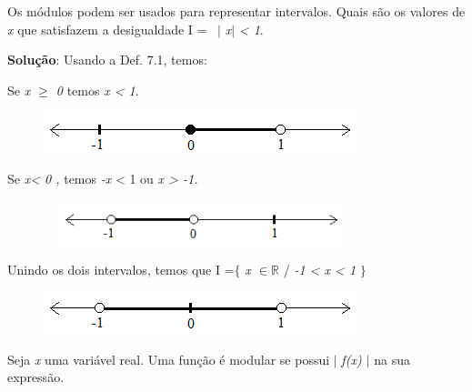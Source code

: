 \begin{texemplo}
Os módulos podem ser usados para representar intervalos. Quais são os valores de \textit{x} que satisfazem a desigualdade  I =~ $ \vert $ \textit{x}$ \vert $  \textit{< 1}. 

\textbf{Solução}: Usando a Def. 7.1, temos:

\quad Se \textit{x $ \geq $  0 } temos \textit{x < 1}.

\begin{figure}[H]
	\begin{Center}
		\includegraphics[width=3.6in,height=0.47in]{capitulos/outras_funcoes/media/image28.png}
	\end{Center}
\end{figure}

\quad Se \textit{x< 0 , } temos \textit{-x} < 1 ou \textit{x > -1.}

\begin{figure}[H]
	\begin{Center}
		\includegraphics[width=3.61in,height=0.5in]{capitulos/outras_funcoes/media/image29.png}
	\end{Center}
\end{figure}

\quad Unindo os dois intervalos, temos que I =$ \{ $ \textit{ x $ \in \mathbb{R} $  \textbf{ }} / \textit{-1 < x < 1} $ \} $  

\begin{figure}[H]
	\begin{Center}
		\includegraphics[width=3.6in,height=0.48in]{capitulos/outras_funcoes/media/image30.png}
	\end{Center}
\end{figure}

\qedsymbol{}

\end{texemplo}
\begin{caixa}
\begin{tdefinicao}
Seja \textit{x} uma variável real. Uma função é modular se possui $ \vert $ \textit{ f(x) $ \vert $ } na sua expressão.
\end{tdefinicao}
\end{caixa}

